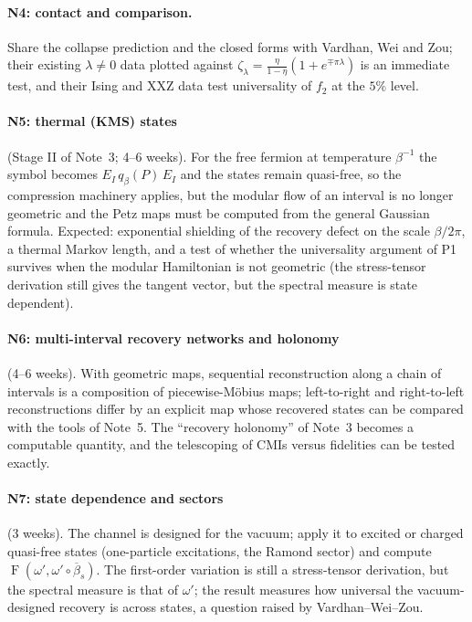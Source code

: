 \documentclass[11pt]{article}
\theoremstyle{accent}
\theoremstyle{definition}
\newcommand{\Fid}{\operatorname{F}}
\begin{document}
\paragraph{N4: contact and comparison.}
Share the collapse prediction and the closed forms with Vardhan, Wei and Zou; their existing \(\lambda\ne0\) data plotted against \(\zeta_\lambda=\frac{\eta}{1-\eta}(1+e^{\mp\pi\lambda})\) is an immediate test, and their Ising and XXZ data test universality of \(f_2\) at the \(5\%\) level.

\paragraph{N5: thermal (KMS) states} (Stage II of Note~3; 4--6 weeks).
For the free fermion at temperature \(\beta^{-1}\) the symbol becomes \(E_I\,q_\beta(P)\,E_I\) and the states remain quasi-free, so the compression machinery applies, but the modular flow of an interval is no longer geometric and the Petz maps must be computed from the general Gaussian formula.  Expected: exponential shielding of the recovery defect on the scale \(\beta/2\pi\), a thermal Markov length, and a test of whether the universality argument of P1 survives when the modular Hamiltonian is not geometric (the stress-tensor derivation still gives the tangent vector, but the spectral measure is state dependent).

\paragraph{N6: multi-interval recovery networks and holonomy} (4--6 weeks).
With geometric maps, sequential reconstruction along a chain of intervals is a composition of piecewise-M\"obius maps; left-to-right and right-to-left reconstructions differ by an explicit map whose recovered states can be compared with the tools of Note~5.  The ``recovery holonomy'' of Note~3 becomes a computable quantity, and the telescoping of CMIs versus fidelities can be tested exactly.

\paragraph{N7: state dependence and sectors} (3 weeks).
The channel is designed for the vacuum; apply it to excited or charged quasi-free states (one-particle excitations, the Ramond sector) and compute \(\Fid(\omega',\omega'\circ\overline\beta_s)\).  The first-order variation is still a stress-tensor derivation, but the spectral measure is that of \(\omega'\); the result measures how universal the vacuum-designed recovery is across states, a question raised by Vardhan--Wei--Zou.
\end{document}
